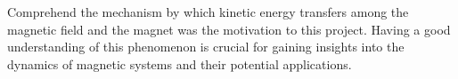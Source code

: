 Comprehend the mechanism by which kinetic energy transfers among the magnetic field and the magnet was the motivation to this project. Having a good understanding of this phenomenon is crucial for gaining insights into the dynamics of magnetic systems and their potential applications.




